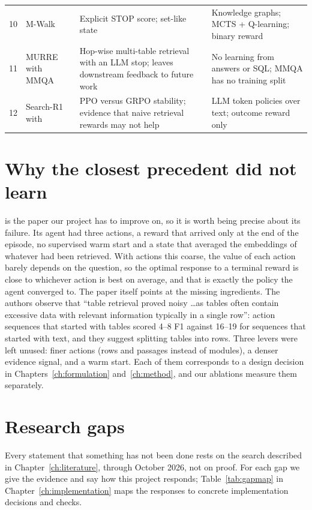 \begin{table}[ht]
\begin{tabularx}{\textwidth}{@{}c>{\raggedright\arraybackslash}p{3.2cm}>{\raggedright\arraybackslash}X>{\raggedright\arraybackslash}X@{}}
10 & M-Walk \citep{shen2018mwalk} & Explicit STOP score; set-like state & Knowledge graphs; MCTS + Q-learning; binary reward \\
11 & MURRE \citep{zhang2025murre} with MMQA \citep{wu2025mmqa} & Hop-wise multi-table retrieval with an LLM stop; leaves downstream feedback to future work & No learning from answers or SQL; MMQA has no training split \\
12 & Search-R1 \citep{jin2025searchr1} with \citet{jin2025empirical} & PPO versus GRPO stability; evidence that naive retrieval rewards may not help & LLM token policies over text; outcome reward only \\
\bottomrule
\end{tabularx}
\end{table}

\section{Why the closest precedent did not learn}

\citet{jose2024qatexttablesdrl} is the paper our project has to improve on, so it is worth being precise about its failure. Its agent had three actions, a reward that arrived only at the end of the episode, no supervised warm start and a state that averaged the embeddings of whatever had been retrieved. With actions this coarse, the value of each action barely depends on the question, so the optimal response to a terminal reward is close to whichever action is best on average, and that is exactly the policy the agent converged to. The paper itself points at the missing ingredients. The authors observe that ``table retrieval proved noisy \ldots as tables often contain excessive data with relevant information typically in a single row'': action sequences that started with tables scored 4--8 F1 against 16--19 for sequences that started with text, and they suggest splitting tables into rows. Three levers were left unused: finer actions (rows and passages instead of modules), a denser evidence signal, and a warm start. Each of them corresponds to a design decision in Chapters~\ref{ch:formulation} and~\ref{ch:method}, and our ablations measure them separately.

\section{Research gaps}

Every statement that something has not been done rests on the search described in Chapter~\ref{ch:literature}, through October 2026, not on proof. For each gap we give the evidence and say how this project responds; Table~\ref{tab:gapmap} in Chapter~\ref{ch:implementation} maps the responses to concrete implementation decisions and checks.

